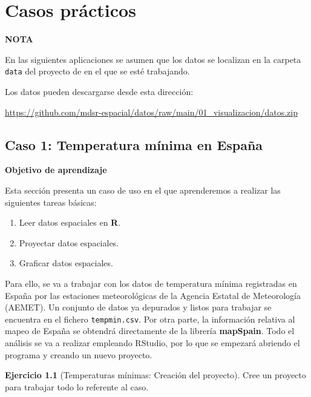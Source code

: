 \documentclass[
]{book}
\theoremstyle{definition}
\theoremstyle{definition}
\theoremstyle{definition}
\newtheorem{exercise}{Ejercicio}[chapter]
\theoremstyle{definition}
\theoremstyle{remark}
\begin{document}
\hypertarget{casos}{%
\chapter{Casos prácticos}\label{casos}}

\begin{infobox}
\textbf{NOTA}

En las siguientes aplicaciones se asumen que los datos se localizan en la
carpeta \texttt{data} del proyecto de  en el que se esté trabajando.

Los datos pueden descargarse desde esta dirección:

\url{https://github.com/mdsr-espacial/datos/raw/main/01_visualizacion/datos.zip}

\end{infobox}

\hypertarget{tempmin}{%
\section{Caso 1: Temperatura mínima en España}\label{tempmin}}

\textbf{Objetivo de aprendizaje}

Esta sección presenta un caso de uso en el que aprenderemos a realizar las
siguientes tareas básicas:

\begin{enumerate}
\def\labelenumi{\arabic{enumi}.}
\item
  Leer datos espaciales en \textbf{R}.
\item
  Proyectar datos espaciales.
\item
  Graficar datos espaciales.
\end{enumerate}

Para ello, se va a trabajar con los datos de temperatura mínima registradas en
España por las estaciones meteorológicas de la Agencia Estatal de Meteorología
(AEMET). Un conjunto de datos ya depurados y listos para trabajar se encuentra
en el fichero \texttt{tempmin.csv}. Por otra parte, la información relativa al mapeo de
España se obtendrá directamente de la librería \textbf{mapSpain}. Todo el análisis se
va a realizar empleando RStudio, por lo que se empezará abriendo el programa y
creando un nuevo proyecto.

\begin{exercise}[Temperaturas mínimas: Creación del proyecto]
\protect\hypertarget{exr:ex-crea}{}\label{exr:ex-crea}Cree un proyecto para trabajar todo lo referente al caso.
\end{exercise}
\end{document}
